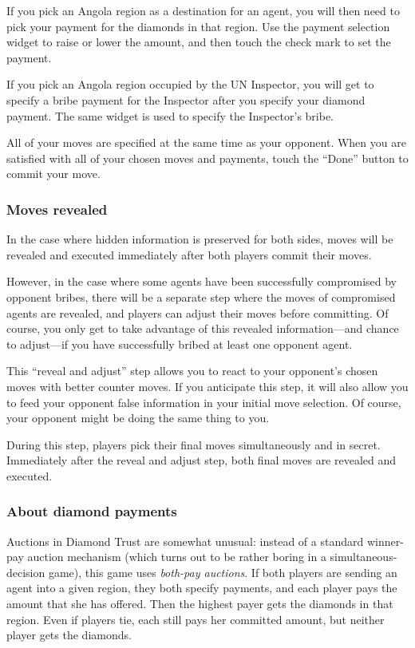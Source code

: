 \documentclass[8pt]{extbook}
\begin{document}
If you pick an Angola region as a destination for an agent, you will then need to pick your payment for the diamonds in that region.  Use the payment selection widget to raise or lower the amount, and then touch the check mark to set the payment.

If you pick an Angola region occupied by the UN Inspector, you will get to specify a bribe payment for the Inspector after you specify your diamond payment.  The same widget is used to specify the Inspector's bribe.

All of your moves are specified at the same time as your opponent.  When you are satisfied with all of your chosen moves and payments, touch the ``Done'' button to commit your move.

\subsubsection{Moves revealed}
\label{sec:movesRevealed}
In the case where hidden information is preserved for both sides, moves will be revealed and executed immediately after both players commit their moves.

However, in the case where some agents have been successfully compromised by opponent bribes, there will be a separate step where the moves of compromised agents are revealed, and players can adjust their moves before committing.  Of course, you only get to take advantage of this revealed information---and chance to adjust---if you have successfully bribed at least one opponent agent.

This ``reveal and adjust'' step allows you to react to your opponent's chosen moves with better counter moves.  If you anticipate this step, it will also allow you to feed your opponent false information in your initial move selection.  Of course, your opponent might be doing the same thing to you.

During this step, players pick their final moves simultaneously and in secret.  Immediately after the reveal and adjust step, both final moves are revealed and executed.

\subsubsection{About diamond payments}
\label{sec:aboutBids}
Auctions in Diamond Trust are somewhat unusual:  instead of a standard winner-pay auction mechanism (which turns out to be rather boring in a simultaneous-decision game), this game uses {\it both-pay auctions}.  If both players are sending an agent into a given region, they both specify payments, and each player pays the amount that she has offered.  Then the highest payer gets the diamonds in that region.  Even if players tie, each still pays her committed amount, but neither player gets the diamonds.
\end{document}
